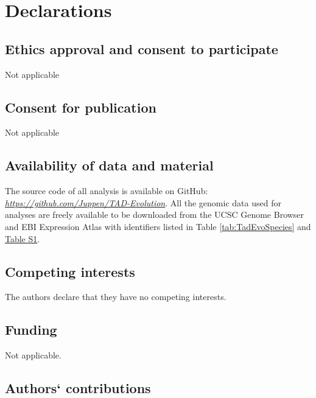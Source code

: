 \documentclass[a4paper,twoside=true,openright,parskip=full,chapterprefix=true,11pt,headings=normal,bibliography=totoc,listof=totoc,titlepage=on,captions=tableabove,draft=false]{scrreprt}
\theoremstyle{definition}
\theoremstyle{definition}
\theoremstyle{definition}
\theoremstyle{remark}
\begin{document}
\hypertarget{declarations}{%
\section{Declarations}\label{declarations}}

\hypertarget{ethics-approval-and-consent-to-participate}{%
\subsection{Ethics approval and consent to
participate}\label{ethics-approval-and-consent-to-participate}}

Not applicable

\hypertarget{consent-for-publication}{%
\subsection{Consent for publication}\label{consent-for-publication}}

Not applicable

\hypertarget{availability-of-data-and-material}{%
\subsection{Availability of data and
material}\label{availability-of-data-and-material}}

The source code of all analysis is available on GitHub:
\href{https://github.com/Juppen/TAD-Evolution}{\emph{https://github.com/Juppen/TAD-Evolution}}.
All the genomic data used for analyses are freely available to be
downloaded from the UCSC Genome Browser and EBI Expression Atlas with
identifiers listed in Table \ref{tab:TadEvoSpecies} and
\protect\hyperlink{TadEvoSupTab}{Table S1}.

\hypertarget{competing-interests}{%
\subsection{Competing interests}\label{competing-interests}}

The authors declare that they have no competing interests.

\hypertarget{funding}{%
\subsection{Funding}\label{funding}}

Not applicable.

\hypertarget{authors-contributions}{%
\subsection{Authors` contributions}\label{authors-contributions}}
\end{document}
